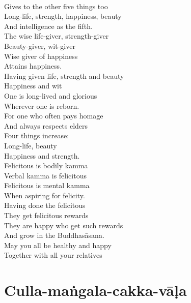 \begin{english-verses}
  \\
  Gives to the other five things too\\
  Long-life, strength, happiness, beauty\\
  And intelligence as the fifth.\\
  The wise life-giver, strength-giver\\
  Beauty-giver, wit-giver\\
  Wise giver of happiness\\
  Attains happiness.\\
  Having given life, strength and beauty\\
  Happiness and wit\\
  One is long-lived and glorious\\
  Wherever one is reborn.\\
  For one who often pays homage\\
  And always respects elders\\
  Four things increase:\\
  Long-life, beauty\\
  Happiness and strength.\\
  Felicitous is bodily kamma\\
  Verbal kamma is felicitous\\
  Felicitous is mental kamma\\
  When aspiring for felicity.\\
  Having done the felicitous\\
  They get felicitous rewards\\
  They are happy who get such rewards\\
  And grow in the Buddhasāsana.\\
  May you all be healthy and happy\\
  Together with all your relatives
\end{english-verses}

\suttaRef{[AN 5.37 / Dhp 109 / AN 3.155]}

\section{Culla-maṅgala-cakka-vāḷa}
\label{culla-mangala-cakka-vala}

 \vspace{-0.6em}

